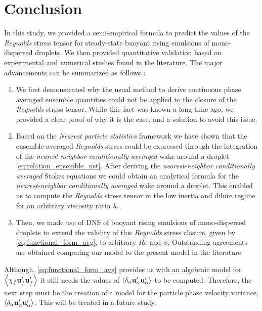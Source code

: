 \section{Conclusion}

In this study, we provided a semi-empirical formula to predict the values of the \textit{Reynolds} stress tensor for steady-state buoyant rising emulsions of mono-dispersed droplets. 
We then provided quantitative validation based on experimental and numerical studies found in the literature. 
The major advancements can be summarized as follows : 
\begin{enumerate}
    \item We first demonstrated why the usual method to derive continuous phase averaged ensemble quantities could not be applied to the closure of the \textit{Reynolds} stress tensor. 
    While this fact was known a long time ago, we provided a clear proof of why it is the case, and a solution to avoid this issue. 
    \item Based on the \textit{Nearest particle statistics} framework we have shown that the ensemble-averaged \textit{Reynolds} stress could be expressed through the integration of the \textit{nearest-neighbor conditionally averaged} wake around a droplet \eqref{eq:relation_ensemble_nst}. 
    After deriving the \textit{nearest-neighbor conditionally averaged} Stokes equations we could obtain an analytical formula for the \textit{nearest-neighbor conditionally averaged} wake around a droplet.
    This enabled us to compute the \textit{Reynolds} stress tensor in the low inertia and dilute regime for an arbitrary viscosity ratio $\lambda$. 
    \item  Then, we made use of DNS of buoyant rising emulsions of mono-dispersed droplets to extend the validity of this \textit{Reynolds} stress closure, given by \ref{eq:functional_form_avg}, to arbitrary $Re$ and $\phi$. 
    Outstanding agreements are obtained comparing our model to the present model in the literature.  
\end{enumerate}
Although, \ref{eq:functional_form_avg} provides us with an algebraic model for $\left<\chi_f \textbf{u}_f'\textbf{u}_f'\right>$ it still needs the values of $\left<\delta_\alpha \textbf{u}_\alpha' \textbf{u}_\alpha'\right>$ to be computed. 
Therefore, the next step must be the creation of a model for the particle phase velocity variance, $\left<\delta_\alpha \textbf{u}_\alpha' \textbf{u}_\alpha'\right>$. 
This will be treated in a future study. 
